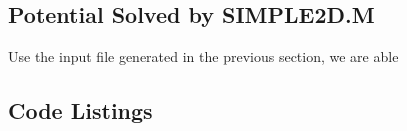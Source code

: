 \documentclass[a4paper,titlepage]{article}
\begin{document}
		\subsection{Potential Solved by SIMPLE2D.M}
			Use the input file generated in the previous section, we are able 
			
	\newpage
	\begin{appendices}
		
		\section{Code Listings} \label{appendix:code}
		
		
		\begin{center}
			\inputminted{python}{../finite_element.py}
			\label{lst:finite_element}
		\end{center}
		
		\begin{center}
			\inputminted{python}{../SIMPLE2Dinput.dat}
			\label{lst:SIMPLE2D.dat}
		\end{center}
		
	\end{appendices}
	
\end{document}
